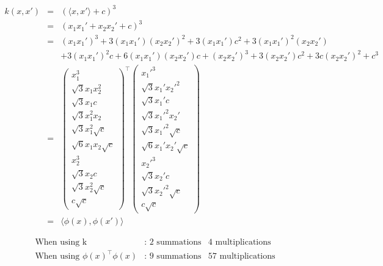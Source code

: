 \begin{eqnarray}
    k(x,x')&=&\left( \langle x,x' \rangle + c \right)^3 \\
    &=&\left(x_1x_1'+x_2x_2'+ c \right)^3 \\
    &=&(x_1x_1')^3 + 3(x_1x_1')(x_2x_2')^2 + 3(x_1x_1')c^2 + 3(x_1x_1')^2(x_2x_2')  \\ \nonumber
    && + 3(x_1x_1')^2c  + 6(x_1x_1')(x_2x_2')c + (x_2x_2')^3 + 3 (x_2x_2')c^2 + 3 c (x_2x_2')^2 + c^3\\
    &=& \begin{pmatrix}
		x_1^3 \\ \sqrt{3} x_1 x_2^2 \\ \sqrt{3} x_1 c \\  \sqrt{3} x_1^2 x_2 \\  \sqrt{3} x_1^2 \sqrt{c} \\
		\sqrt{6} x_1 x_2 \sqrt{c} \\ x_2^3 \\  \sqrt{3} x_2 c \\ \sqrt{3} x_2^2 \sqrt{c} \\ c \sqrt{c}
	\end{pmatrix}^\top
 	\begin{pmatrix}
		x_1'^3 \\ \sqrt{3} x_1' x_2'^2 \\ \sqrt{3} x_1' c \\  \sqrt{3} x_1'^2 x_2' \\  \sqrt{3} x_1'^2 \sqrt{c} \\
		\sqrt{6} x_1' x_2' \sqrt{c} \\ x_2'^3 \\  \sqrt{3} x_2' c \\ \sqrt{3} x_2'^2 \sqrt{c} \\ c \sqrt{c}
	\end{pmatrix}\\
	&=&\langle \phi(x), \phi(x') \rangle
\end{eqnarray}

\begin{align}\nonumber
    \text{When using k} &\text{: 2 summations} & \text{4 multiplications} \\ \nonumber
    \text{When using }\phi(x)^\top\phi(x) &\text{: 9 summations} & \text{57 multiplications}
\end{align}
